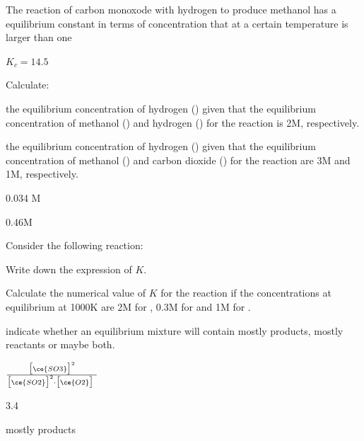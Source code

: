 \documentclass[main.tex]{subfiles}
\begin{document}
\begin{multicols*}{2}
\begin{question}[ID=\the\value{numA}]
The reaction of carbon monoxode with hydrogen to produce methanol has a equilibrium constant in terms of concentration that at a certain temperature is larger than one
\begin{center} \hfill  $K_{c}=14.5$\end{center}
Calculate:
\begin{inparaenum}[(a)]
\item the equilibrium concentration of hydrogen () given that the equilibrium concentration of methanol () and hydrogen () for the reaction is 2M, respectively. %
\item the equilibrium concentration of hydrogen () given that the equilibrium concentration of methanol () and carbon dioxide () for the reaction are 3M and 1M, respectively.  %
 \end{inparaenum}
\end{question}
\begin{solution}
\begin{inparaenum}[(a)]
\item  0.034 M
\item  0.46M
 \end{inparaenum}\hspace{0.1cm}\end{solution}%




\begin{question}[ID=\the\value{numA}]
Consider the following reaction:
\begin{center}\end{center}
\begin{inparaenum}[(a)]
\item Write down the expression of $K$.
\item Calculate the numerical value of $K$ for the reaction if the concentrations at equilibrium at 1000K are 2M for , 0.3M for  and 1M for .
\item indicate whether an equilibrium mixture will contain mostly products, mostly reactants or maybe both.
 \end{inparaenum}
\end{question}
\begin{solution}
\begin{inparaenum}[(a)]
\item $\frac{  \big[\ce{SO3} \big]^2  } { \big[\ce{SO2} \big]^2 \cdot \big[\ce{O2} \big]\  } $
\item 3.4
\item mostly products
 \end{inparaenum}
\hspace{0.1cm}\end{solution}%


\end{multicols*}
\end{document}
